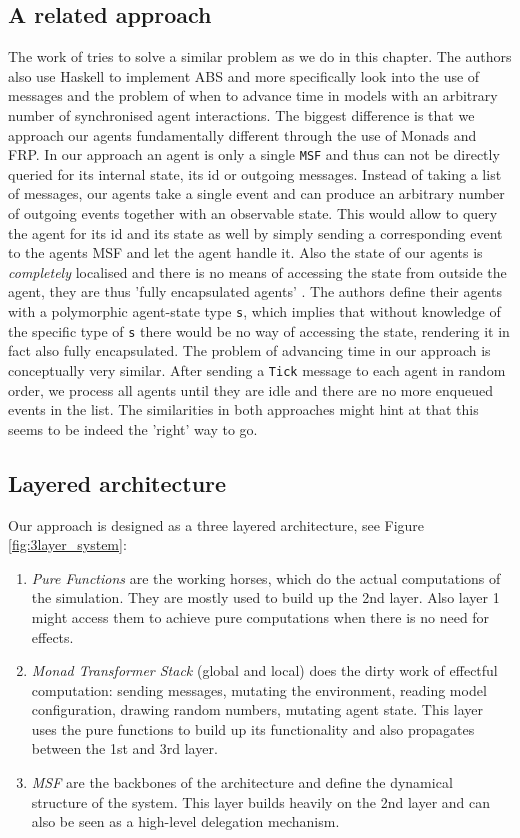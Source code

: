 \subsection{A related approach}
The work of \cite{botta_time_2010} tries to solve a similar problem as we do in this chapter. The authors also use Haskell to implement ABS and more specifically look into the use of messages and the problem of when to advance time in models with an arbitrary number of synchronised agent interactions.
The biggest difference is that we approach our agents fundamentally different through the use of Monads and FRP. In our approach an agent is only a single \texttt{MSF} and thus can not be directly queried for its internal state, its id or outgoing messages. Instead of taking a list of messages, our agents take a single event and can produce an arbitrary number of outgoing events together with an observable state. This would allow to query the agent for its id and its state as well by simply sending a corresponding event to the agents MSF and let the agent handle it. Also the state of our agents is \textit{completely} localised and there is no means of accessing the state from outside the agent, they are thus 'fully encapsulated agents' \cite{botta_time_2010}. The authors define their agents with a polymorphic agent-state type \texttt{s}, which implies that without knowledge of the specific type of \texttt{s} there would be no way of accessing the state, rendering it in fact also fully encapsulated.
The problem of advancing time in our approach is conceptually very similar. After sending a \texttt{Tick} message to each agent in random order, we process all agents until they are idle and there are no more enqueued events in the list. The similarities in both approaches might hint at that this seems to be indeed the 'right' way to go. %

\subsection{Layered architecture}
Our approach is designed as a three layered architecture, see Figure \ref{fig:3layer_system}:
\begin{enumerate}
	\item \textit{Pure Functions} are the working horses, which do the actual computations of the simulation. They are mostly used to build up the 2nd layer. Also layer 1 might access them to achieve pure computations when there is no need for effects.
	\item \textit{Monad Transformer Stack} (global and local) does the dirty work of effectful computation: sending messages, mutating the environment, reading model configuration, drawing random numbers, mutating agent state. This layer uses the pure functions to build up its functionality and also propagates between the 1st and 3rd layer.
	\item \textit{MSF} are the backbones of the architecture and define the dynamical structure of the system. This layer builds heavily on the 2nd layer and can also be seen as a high-level delegation mechanism. %
\end{enumerate}

